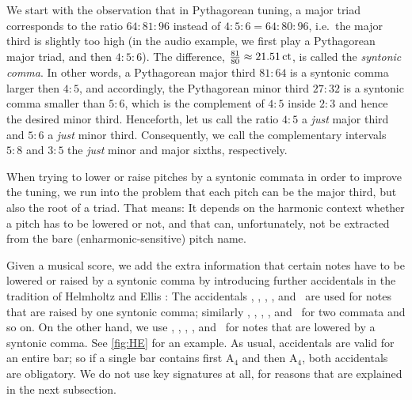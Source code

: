 \documentclass[british,11pt]{scrartcl}
\begin{document}
We start with the observation that in Pythagorean tuning, a major triad
corresponds to the ratio $64:81:96$ instead of $4:5:6=64:80:96$, i.e.\ the major
third is slightly too high (in the audio example, we first play a Pythagorean
major triad, and then $4:5:6$). The difference,
$\frac{81}{80}\approx 21.51\,\mathrm{ct}$, is called the \emph{syntonic comma}.
In other words, a Pythagorean major third $81:64$ is a syntonic comma larger then
$4:5$, and accordingly, the Pythagorean minor third $27:32$ is a syntonic comma
smaller than $5:6$, which is the complement of $4:5$ inside $2:3$ and hence the
desired minor third. Henceforth, let us call the ratio $4:5$ a \emph{just} major
third and $5:6$ a \emph{just} minor third. Consequently, we call the
complementary intervals $5:8$ and $3:5$ the \emph{just} minor and major sixths,
respectively.

When trying to lower or raise pitches by a syntonic commata in order to improve
the tuning, we run into the problem that each pitch can be the major third, but
also the root of a triad. That means: It depends on the harmonic context whether
a pitch has to be lowered or not, and that can, unfortunately, not be extracted
from the bare (enharmonic-sensitive) pitch name.

Given a musical score, we add the extra information that certain notes have to
be lowered or raised by a syntonic comma by introducing further accidentals in
the tradition of Helmholtz and Ellis \cite{HE}: The accidentals \dsharpp,
\sharpp, \naturalp, \flatp, and \dflatp\ are used for notes that are raised by
one syntonic comma; similarly \dsharpp, \sharppp, \naturalpp, \flatpp, and
\dflatpp\ for two commata and so on. On the other hand, we use \dsharpm,
\sharpm, \naturalm, \flatm, and \flatmm\ for notes that are lowered by a
syntonic comma. See \cref{fig:HE} for an example.  As usual, accidentals are
valid for an entire bar; so if a single bar contains first \naturalm A$_4$ and
then \natural A$_4$, both accidentals are obligatory.  We do not use key
signatures at all, for reasons that are explained in the next
subsection.
\end{document}
